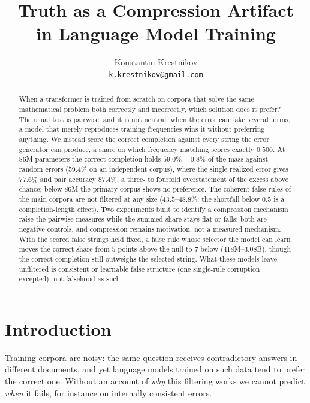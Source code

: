 \documentclass{article}
\title{Truth as a Compression Artifact\\in Language Model Training}
\author{Konstantin Krestnikov\\ \texttt{k.krestnikov@gmail.com}}
\date{}
\begin{document}
\maketitle

\begin{abstract}
When a transformer is trained from scratch on corpora that solve the same mathematical problem both correctly and incorrectly, which solution does it prefer? The usual test is pairwise, and it is not neutral: when the error can take several forms, a model that merely reproduces training frequencies wins it without preferring anything. We instead score the correct completion against every string the error generator can produce, a share on which frequency matching scores exactly $0.500$. At 86M parameters the correct completion holds $59.0\% \pm 0.8\%$ of the mass against random errors ($59.4\%$ on an independent corpus), where the single realized error gives $77.6\%$ and pair accuracy $87.4\%$, a three- to fourfold overstatement of the excess above chance; below 86M the primary corpus shows no preference. The coherent false rules of the main corpora are not filtered at any size ($43.5$--$48.8\%$; the shortfall below $0.5$ is a completion-length effect). Two experiments built to identify a compression mechanism raise the pairwise measures while the summed share stays flat or falls: both are negative controls, and compression remains motivation, not a measured mechanism. With the scored false strings held fixed, a false rule whose selector the model can learn moves the correct share from $5$ points above the null to $7$ below (418M--3.08B), though the correct completion still outweighs the selected string. What these models leave unfiltered is consistent or learnable false structure (one single-rule corruption excepted), not falsehood as such.
\end{abstract}

\section{Introduction}

Training corpora are noisy: the same question receives contradictory answers in different documents, and yet language models trained on such data tend to prefer the correct one. Without an account of \emph{why} this filtering works we cannot predict \emph{when} it fails, for instance on internally consistent errors.
\end{document}
